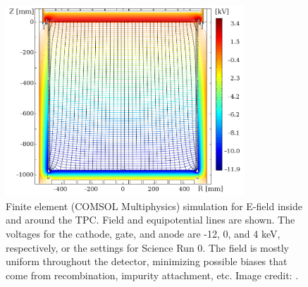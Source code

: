 \bgroup
\def\arraystretch{1.2}
\begin{table}
\centering
{}
\caption{Properties for TPC electrodes.  The cathode and bottom screening mesh have high transparency to optimize S1 light collection and
are gold-plated to increase workfunction.}
\label{tab:xenon1t_tpc_electrodes}
\end{table}

\egroup

\begin{figure}
\centering
\includegraphics[width=0.8\textwidth]{ElectricField}
\caption{Finite element (COMSOL Multiphysics) simulation for E-field inside and around the TPC.  Field and equipotential lines are
shown.  The voltages for the cathode, gate, and anode are -12, 0, and 4 keV, respectively, or the settings for Science Run 0.  The field
is mostly uniform throughout the detector, minimizing possible biases that come from recombination, impurity attachment, etc.  Image
credit: .}
\label{fig:xenon1t_tpc_efield}
\end{figure}

